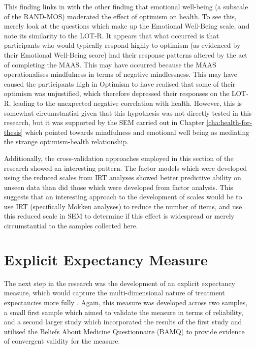 This finding links in with the other finding that emotional well-being (a subscale of the RAND-MOS) moderated the effect of optimism on health. To see this, merely look at the questions which make up the Emotional Well-Being scale, and note its similarity to the LOT-R. It appears that what occurred is that participants who would typically respond highly to optimism (as evidenced by their Emotional Well-Being score) had their response patterns altered by the act of completing the MAAS. This may have occurred because the MAAS operationalises mindfulness in terms of negative mindlessness. This may have caused the participants high in Optimism to have realised that some of their optimism was unjustified, which therefore depressed their responses on the LOT-R, leading to the unexpected negative correlation with health. However, this is somewhat circumstantial given that this hypothesis was not directly tested in this research, but it was supported by the SEM carried out in Chapter \ref{cha:health-for-thesis} which pointed towards mindfulness and emotional well being as mediating the strange optimism-health relationship.

Additionally, the cross-validation approaches employed in this section of the research showed an interesting pattern. The factor models which were developed using the reduced scales from IRT analyses showed better predictive ability on unseen data than did those which were developed from factor analysis. This suggests that an interesting approach to the development of scales would be to use IRT (specifically Mokken analyses) to reduce the number of items, and use this reduced scale in SEM to determine if this effect is widespread or merely circumstantial to the samples collected here. 

\section{Explicit Expectancy Measure}
\label{sec:expl-expect-meas}

The next step in the research was the development of an explicit expectancy measure, which would capture the multi-dimensional nature of treatment expectancies more fully \cite{Stone2005}. Again, this measure was developed across two samples, a small first sample which aimed to validate the measure in terms of reliability, and a second larger study which incorporated the results of the first study and utilised the Beliefs About Medicine Questionnaire (BAMQ) \cite{Horne1999} to provide evidence of convergent validity for the measure. 

